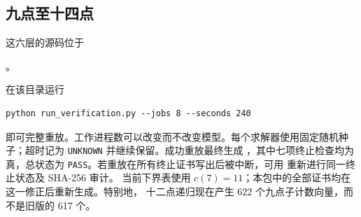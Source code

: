 \subsection{九点至十四点}

这六层的源码位于
\begin{center}
。
\end{center}
在该目录运行
\begin{verbatim}
python run_verification.py --jobs 8 --seconds 240
\end{verbatim}
即可完整重放。工作进程数可以改变而不改变模型。每个求解器使用固定随机种子；超时记为
\texttt{UNKNOWN} 并继续保留。成功重放最终生成
，其中七项终止检查均为真，总状态为
\texttt{PASS}。若重放在所有终止证书写出后被中断，可用
 重新进行同一终止状态及 SHA-256 审计。
当前下界表使用 $c(7)=11$；本包中的全部证书均在这一修正后重新生成。特别地，
十二点递归现在产生 622 个九点子计数向量，而不是旧版的 617 个。

